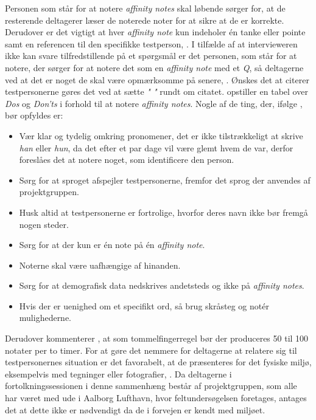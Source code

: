 Personen som står for at notere \textit{affinity notes} skal løbende sørger for, at de resterende deltagerer læser de noterede noter for at sikre at de er korrekte. Derudover er det vigtigt at hver \textit{affinity note} kun indeholer én tanke eller pointe samt en referencen til den specifikke testperson, \parencite[s. 115]{Book:CIInterpretationSession}. I tilfælde af at intervieweren ikke kan svare tilfredstillende på et spørgsmål er det personen, som står for at notere, der sørger for at notere det som en \textit{affinity note} med et \textit{Q}, så deltagerne ved at det er noget de skal være opmærksomme på senere, \parencite[s. 115]{Book:CIInterpretationSession}. Ønskes det at citerer testpersonerne gøres det ved at sætte \textit{" "} rundt om citatet. \textcite[s. 116]{Book:CIInterpretationSession} opstiller en tabel over \textit{Dos} og \textit{Don'ts} i forhold til at notere \textit{affinity notes}. Nogle af de ting, der, ifølge \textcite[s. 116]{Book:CIInterpretationSession}, bør opfyldes er:\blankline
%
\begin{itemize}
  \item Vær klar og tydelig omkring pronomener, det er ikke tilstrækkeligt at skrive \textit{han} eller \textit{hun}, da det efter et par dage vil være glemt hvem de var, derfor foreslåes det at notere noget, som identificere den person.
  \item Sørg for at sproget afspejler testpersonerne, fremfor det sprog der anvendes af projektgruppen.
  \item  Husk altid at testpersonerne er fortrolige, hvorfor deres navn ikke bør fremgå nogen steder. 
  \item Sørg for at der kun er én note på én \textit{affinity note}.
  \item Noterne skal være uafhængige af hinanden. 
  \item Sørg for at demografisk data nedskrives andetsteds og ikke på \textit{affinity notes}. 
  \item Hvis der er uenighed om et specifikt ord, så brug skråsteg og notér mulighederne.\blankline
\end{itemize}
%
Derudover kommenterer \textcite[s. 116]{Book:CIInterpretationSession},  at som tommelfingerregel bør der produceres 50 til 100 notater per to timer. For at gøre det nemmere for deltagerne at relatere sig til testpersonernes situation er det favorabelt, at de præsenteres for det fysiske miljø, eksempelvis med tegninger eller fotografier, \parencite[s. 119]{Book:CIInterpretationSession}. Da deltagerne i fortolkningssessionen i denne sammenhæng består af projektgruppen, som alle har været med ude i Aalborg Lufthavn, hvor feltundersøgelsen foretages, antages det at dette ikke er nødvendigt da de i forvejen er kendt med miljøet. 

